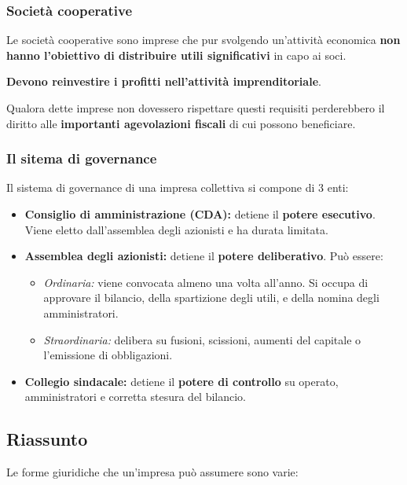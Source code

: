 \documentclass[../main.tex]{subfiles}
\begin{document}
\subsubsection{Società cooperative}

Le società cooperative sono imprese che pur svolgendo un'attività economica \textbf{non hanno l'obiettivo di distribuire utili significativi} in capo ai soci.

\textbf{Devono reinvestire i profitti nell'attività imprenditoriale}.

Qualora dette imprese non dovessero rispettare questi requisiti perderebbero il diritto alle \textbf{importanti agevolazioni fiscali} di cui possono beneficiare.

\subsubsection{Il sitema di governance}

Il sistema di governance di una impresa collettiva si compone di 3 enti:

\begin{itemize}
	\item \textbf{Consiglio di amministrazione (CDA):} detiene il \textbf{potere esecutivo}. Viene eletto dall'assemblea degli azionisti e ha durata limitata.
	\item \textbf{Assemblea degli azionisti:} detiene il \textbf{potere deliberativo}. Può essere:
	      \begin{itemize}
		      \item \emph{Ordinaria:} viene convocata almeno una volta all'anno. Si occupa di approvare il bilancio, della spartizione degli utili, e della nomina degli amministratori.

		      \item \emph{Straordinaria:} delibera su fusioni, scissioni, aumenti del capitale o l'emissione di obbligazioni.

	      \end{itemize}
	\item \textbf{Collegio sindacale:} detiene il \textbf{potere di controllo} su operato, amministratori e corretta stesura del bilancio.
\end{itemize}


\subsection{Riassunto}

Le forme giuridiche che un'impresa può assumere sono varie:
\end{document}
